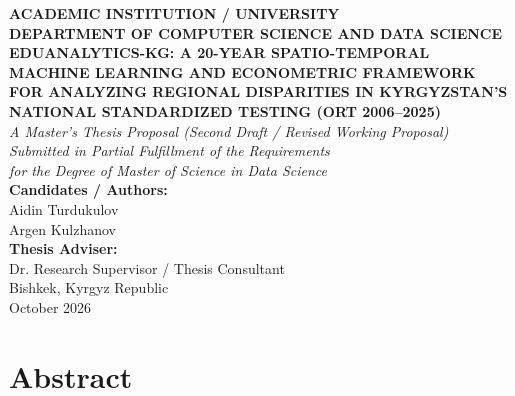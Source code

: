 \documentclass[12pt,letterpaper]{report}
\begin{document}
\begin{titlepage}
\begin{center}
    \begin{singlespace}
        \textbf{\large ACADEMIC INSTITUTION / UNIVERSITY}\\
        \textbf{\large DEPARTMENT OF COMPUTER SCIENCE AND DATA SCIENCE}\\[2.0cm]

        \textbf{\Large EDUANALYTICS-KG: A 20-YEAR SPATIO-TEMPORAL MACHINE LEARNING AND ECONOMETRIC FRAMEWORK FOR ANALYZING REGIONAL DISPARITIES IN KYRGYZSTAN'S NATIONAL STANDARDIZED TESTING (ORT 2006--2025)}\\[1.8cm]

        \textit{A Master's Thesis Proposal (Second Draft / Revised Working Proposal)}\\
        \textit{Submitted in Partial Fulfillment of the Requirements}\\
        \textit{for the Degree of Master of Science in Data Science}\\[1.8cm]

        \textbf{Candidates / Authors:}\\
        Aidin Turdukulov\\
        Argen Kulzhanov\\[1.0cm]

        \textbf{Thesis Adviser:}\\
        Dr. Research Supervisor / Thesis Consultant\\[1.8cm]

        Bishkek, Kyrgyz Republic\\
        October 2026
    \end{singlespace}
\end{center}
\end{titlepage}

\pagestyle{prefatory}
\setcounter{page}{2}

\chapter*{Abstract}
\end{document}
